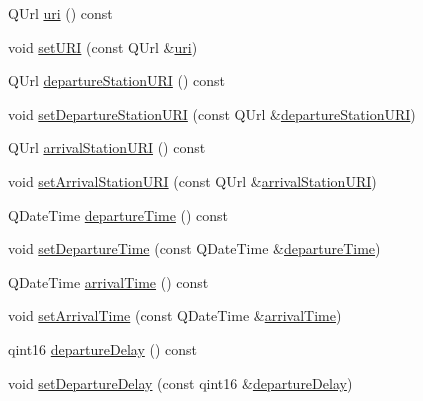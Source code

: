 \begin{DoxyCompactItemize}
Q\+Url \mbox{\hyperlink{classQRail_1_1Fragments_1_1Fragment_ae5f38f826040cb216e345ce6eb26ebb6}{uri}} () const
\item 
void \mbox{\hyperlink{classQRail_1_1Fragments_1_1Fragment_a37968aff7ee593ffd07a935e028868c9}{set\+U\+RI}} (const Q\+Url \&\mbox{\hyperlink{classQRail_1_1Fragments_1_1Fragment_ae5f38f826040cb216e345ce6eb26ebb6}{uri}})
\item 
Q\+Url \mbox{\hyperlink{classQRail_1_1Fragments_1_1Fragment_a5b64058868e96c5ca56b91405ca51683}{departure\+Station\+U\+RI}} () const
\item 
void \mbox{\hyperlink{classQRail_1_1Fragments_1_1Fragment_aeb4a5ba7ffc5cd4e632bc17edd53ae39}{set\+Departure\+Station\+U\+RI}} (const Q\+Url \&\mbox{\hyperlink{classQRail_1_1Fragments_1_1Fragment_a5b64058868e96c5ca56b91405ca51683}{departure\+Station\+U\+RI}})
\item 
Q\+Url \mbox{\hyperlink{classQRail_1_1Fragments_1_1Fragment_a196eaba03a9dd9751a011e30a1e37dd4}{arrival\+Station\+U\+RI}} () const
\item 
void \mbox{\hyperlink{classQRail_1_1Fragments_1_1Fragment_a067006f48ff9e2d7cf8178692333c510}{set\+Arrival\+Station\+U\+RI}} (const Q\+Url \&\mbox{\hyperlink{classQRail_1_1Fragments_1_1Fragment_a196eaba03a9dd9751a011e30a1e37dd4}{arrival\+Station\+U\+RI}})
\item 
Q\+Date\+Time \mbox{\hyperlink{classQRail_1_1Fragments_1_1Fragment_a95d2c99a166573817bd8d8aa8b688b5e}{departure\+Time}} () const
\item 
void \mbox{\hyperlink{classQRail_1_1Fragments_1_1Fragment_a971abc72093b4706f31b8c8f0c3e5b41}{set\+Departure\+Time}} (const Q\+Date\+Time \&\mbox{\hyperlink{classQRail_1_1Fragments_1_1Fragment_a95d2c99a166573817bd8d8aa8b688b5e}{departure\+Time}})
\item 
Q\+Date\+Time \mbox{\hyperlink{classQRail_1_1Fragments_1_1Fragment_ae8b17e8f7219d6252ffffcd4e20e7a35}{arrival\+Time}} () const
\item 
void \mbox{\hyperlink{classQRail_1_1Fragments_1_1Fragment_a414c20e8e0cb8cacdfc3cf2ab8e98f01}{set\+Arrival\+Time}} (const Q\+Date\+Time \&\mbox{\hyperlink{classQRail_1_1Fragments_1_1Fragment_ae8b17e8f7219d6252ffffcd4e20e7a35}{arrival\+Time}})
\item 
qint16 \mbox{\hyperlink{classQRail_1_1Fragments_1_1Fragment_aa0e43583b4d64c688f5fa7e9b13b0855}{departure\+Delay}} () const
\item 
void \mbox{\hyperlink{classQRail_1_1Fragments_1_1Fragment_a21cc925af677f647ce0e76b14532d2ac}{set\+Departure\+Delay}} (const qint16 \&\mbox{\hyperlink{classQRail_1_1Fragments_1_1Fragment_aa0e43583b4d64c688f5fa7e9b13b0855}{departure\+Delay}})

\end{DoxyCompactItemize}
